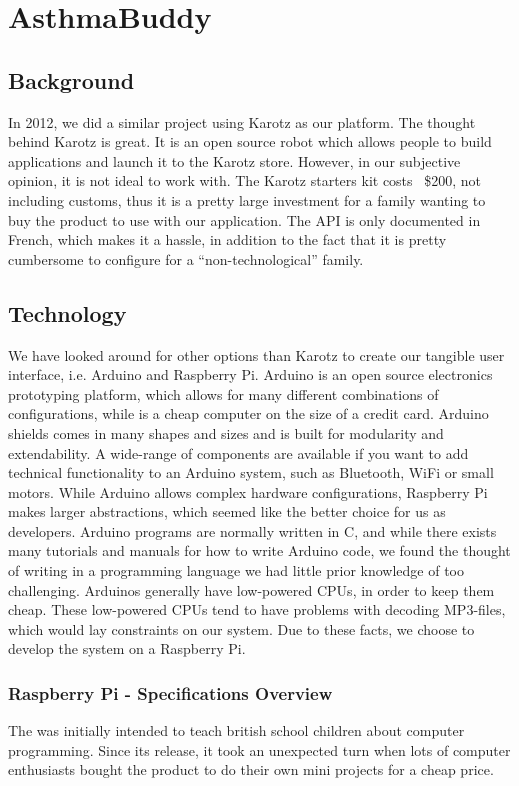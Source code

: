 
\chapter{AsthmaBuddy}
\label{chp:our-solution}

\section{Background}
In 2012, we did a similar project using Karotz  as our platform\cite{CustomerDriven}. The thought behind Karotz is great. It is an open source robot which allows people to build applications and launch it to the Karotz store. However, in our subjective opinion, it is not ideal to work with. The Karotz starters kit costs ~\$200, not including customs, thus it is a pretty large investment for a family wanting to buy the product to use with our application. The API is only documented in French, which makes it a hassle, in addition to the fact that it is pretty cumbersome to configure for a ``non-technological'' family. 

\section{Technology}
We have looked around for other options than Karotz to create our tangible user interface, i.e. Arduino and Raspberry Pi. Arduino is an open source electronics prototyping platform\cite{arduino}, which allows for many different combinations of configurations, while \rpi{} is a cheap computer on the size of a credit card. Arduino shields comes in many shapes and sizes and is built for modularity and extendability. A wide-range of components are available if you want to add technical functionality to an Arduino system, such as Bluetooth, WiFi or small motors. 
While Arduino allows complex hardware configurations, Raspberry Pi makes larger abstractions, which seemed like the better choice for us as developers. Arduino programs are normally written in C\cite{strahl2000language}, and while there exists many tutorials and manuals for how to write Arduino code, we found the thought of writing in a programming language we had little prior knowledge of too challenging. Arduinos generally have low-powered CPUs, in order to keep them cheap. These low-powered CPUs tend to have problems with decoding MP3-files, which would lay constraints on our system. Due to these facts, we choose to develop the system on a Raspberry Pi.


\subsection{Raspberry Pi - Specifications Overview}
The \rpi{} was initially intended to teach british school children about computer programming\cite{rasperrypi-about}. Since its release, it took an unexpected turn when lots of computer enthusiasts bought the product to do their own mini projects for a cheap price. 

